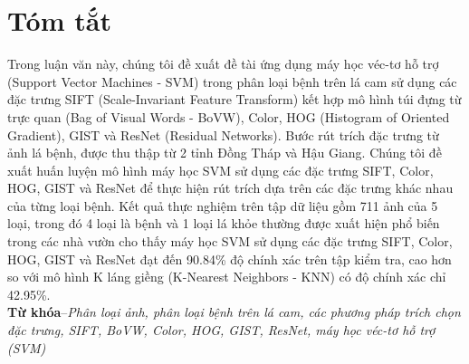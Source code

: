 \chapter*{\Huge Tóm tắt}
Trong luận văn này, chúng tôi đề xuất đề tài ứng dụng máy học véc-tơ hỗ trợ (Support Vector Machines - SVM) trong phân loại bệnh trên lá cam sử dụng các đặc trưng SIFT (Scale-Invariant Feature Transform) kết hợp mô hình túi đựng từ trực quan (Bag of Visual Words - BoVW), Color, HOG (Histogram of Oriented Gradient), GIST và ResNet (Residual Networks). Bước rút trích đặc trưng từ ảnh lá bệnh, được thu thập từ 2 tỉnh Đồng Tháp và Hậu Giang. Chúng tôi đề xuất huấn luyện mô hình máy học SVM sử dụng các đặc trưng SIFT, Color, HOG, GIST và ResNet để thực hiện rút trích dựa trên các đặc trưng khác nhau của từng loại bệnh. Kết quả thực nghiệm trên tập dữ liệu gồm 711 ảnh của 5 loại, trong đó 4 loại là bệnh và 1 loại lá khỏe thường được xuất hiện phổ biến trong các nhà vườn cho thấy máy học SVM sử dụng các đặc trưng SIFT, Color, HOG, GIST và ResNet đạt đến 90.84\% độ chính xác trên tập kiểm tra, cao hơn so với mô hình K láng giềng (K-Nearest Neighbors - KNN) có độ chính xác chỉ 42.95\%.\\

\noindent \textbf{Từ khóa}--\emph{Phân loại ảnh, phân loại bệnh trên lá cam, các phương pháp trích chọn đặc trưng, SIFT, BoVW, Color, HOG, GIST, ResNet, máy học véc-tơ hỗ trợ (SVM)}